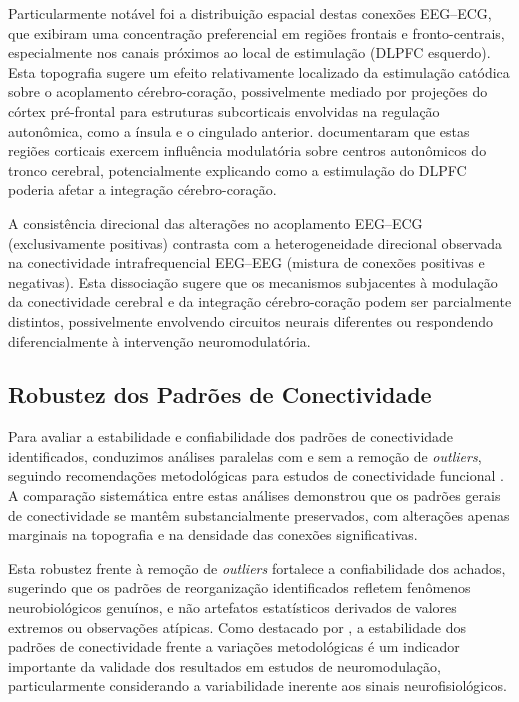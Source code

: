 Particularmente notável foi a distribuição espacial destas conexões EEG--ECG, que exibiram uma concentração preferencial em regiões frontais e fronto-centrais, especialmente nos canais próximos ao local de estimulação (DLPFC esquerdo). Esta topografia sugere um efeito relativamente localizado da estimulação catódica sobre o acoplamento cérebro-coração, possivelmente mediado por projeções do córtex pré-frontal para estruturas subcorticais envolvidas na regulação autonômica, como a ínsula e o cingulado anterior. \cite{criscuolo2022cognition} documentaram que estas regiões corticais exercem influência modulatória sobre centros autonômicos do tronco cerebral, potencialmente explicando como a estimulação do DLPFC poderia afetar a integração cérebro-coração.

A consistência direcional das alterações no acoplamento EEG--ECG (exclusivamente positivas) contrasta com a heterogeneidade direcional observada na conectividade intrafrequencial EEG--EEG (mistura de conexões positivas e negativas). Esta dissociação sugere que os mecanismos subjacentes à modulação da conectividade cerebral e da integração cérebro-coração podem ser parcialmente distintos, possivelmente envolvendo circuitos neurais diferentes ou respondendo diferencialmente à intervenção neuromodulatória.

\subsection{Robustez dos Padrões de Conectividade}
Para avaliar a estabilidade e confiabilidade dos padrões de conectividade identificados, conduzimos análises paralelas com e sem a remoção de \textit{outliers}, seguindo recomendações metodológicas para estudos de conectividade funcional \cite{bullmore2009complex}. A comparação sistemática entre estas análises demonstrou que os padrões gerais de conectividade se mantêm substancialmente preservados, com alterações apenas marginais na topografia e na densidade das conexões significativas.

Esta robustez frente à remoção de \textit{outliers} fortalece a confiabilidade dos achados, sugerindo que os padrões de reorganização identificados refletem fenômenos neurobiológicos genuínos, e não artefatos estatísticos derivados de valores extremos ou observações atípicas. Como destacado por \cite{singh2024evaluating}, a estabilidade dos padrões de conectividade frente a variações metodológicas é um indicador importante da validade dos resultados em estudos de neuromodulação, particularmente considerando a variabilidade inerente aos sinais neurofisiológicos.

